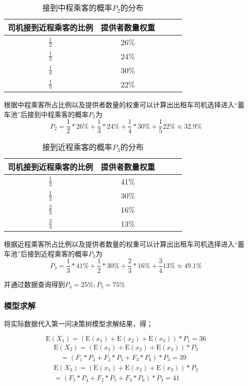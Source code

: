 \documentclass[withoutpreface,bwprint]{cumcmthesis} %
\begin{document}
\begin{table}[!htbp]
	\caption{接到中程乘客的概率$P_2$的分布}\label{tab:001} \centering
	\begin{tabular}{ccccc}
		\toprule[1.5pt]
		司机接到近程乘客的比例& 提供者数量权重\\
		\midrule[1pt]
		$\frac{1}{2}$ & 26$\%$\\
		$\frac{1}{3}$ & 24$\%$\\
		$\frac{1}{4}$ & 30$\%$\\
		$\frac{1}{5}$ & 22$\%$\\
		\bottomrule[1.5pt]
	\end{tabular}
\end{table}

根据中程乘客所占比例以及提供者数量的权重可以计算出出租车司机选择进入“蓄车池”后接到中程乘客的概率$P_2$为
$$
P_{2}=\frac{1}{2} * 26 \%+\frac{1}{3} * 24 \%+\frac{1}{4} * 30 \%+\frac{1}{5} 22 \% \approx 32.9 \%
$$

\begin{table}[!htbp]
	\caption{接到近程乘客的概率$P_3$的分布}\label{tab:001} \centering
	\begin{tabular}{ccccc}
		\toprule[1.5pt]
		司机接到近程乘客的比例& 提供者数量权重\\
		\midrule[1pt]
		$\frac{1}{3}$ & 41$\%$\\
		$\frac{1}{2}$ & 30$\%$\\
		$\frac{2}{3}$ & 16$\%$\\
		$\frac{3}{4}$ & 13$\%$\\
		\bottomrule[1.5pt]
	\end{tabular}
\end{table}

根据近程乘客所占比例以及提供者数量的权重可以计算出出租车司机选择进入“蓄车池”后接到近程乘客的概率$P_3$为
$$
P_{3}=\frac{1}{3} * 41 \%+\frac{1}{2} * 30 \%+\frac{2}{3} * 16 \%+\frac{3}{4} 13 \% \approx 49.1 \%
$$

并通过数据查询得到$P_{4}=25 \% ; P_{5}=75 \%$

\subsubsection{模型求解}
将实际数据代入第一问决策树模型求解结果，得；

$$
\mathrm{E}\left(X_{1}\right)=\left(\mathrm{E}\left(x_{1}\right)+\mathrm{E}\left(x_{2}\right)+\mathrm{E}\left(x_{3}\right)\right) * P_{1}=36
$$
$$
\begin{array}{l}{\mathrm{E}\left(X_{2}\right)=\left(\mathrm{E}\left(x_{1}\right)+\mathrm{E}\left(x_{2}\right)+\mathrm{E}\left(x_{3}\right)\right) * P_{2}} \\ {\quad=\left(F_{1} * P_{4}+F_{2} * P_{5}+F_{3} * P_{6}\right) * P_{3}}=39\end{array}
$$
$$
\begin{array}{l}{\mathrm{E}\left(X_{3}\right)=\left(\mathrm{E}\left(x_{1}\right)+\mathrm{E}\left(x_{2}\right)+\mathrm{E}\left(x_{3}\right)\right) * P_{3}} \\ {=\left(F_{1} * P_{4}+F_{2} * P_{5}+F_{3} * P_{6}\right) * P_{3}}=41\end{array}
$$
\end{document}
